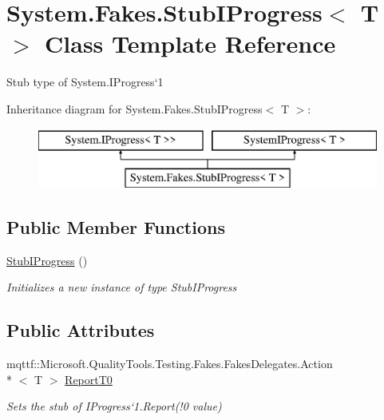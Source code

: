 \hypertarget{class_system_1_1_fakes_1_1_stub_i_progress_3_01_t_01_4}{\section{System.\-Fakes.\-Stub\-I\-Progress$<$ T $>$ Class Template Reference}
\label{class_system_1_1_fakes_1_1_stub_i_progress_3_01_t_01_4}
}


Stub type of System.\-I\-Progress`1 


Inheritance diagram for System.\-Fakes.\-Stub\-I\-Progress$<$ T $>$\-:\begin{figure}[H]
\begin{center}
\leavevmode
\includegraphics[height=2.000000cm]{class_system_1_1_fakes_1_1_stub_i_progress_3_01_t_01_4}
\end{center}
\end{figure}
\subsection*{Public Member Functions}
\begin{DoxyCompactItemize}
\item 
\hyperlink{class_system_1_1_fakes_1_1_stub_i_progress_3_01_t_01_4_ab850596642686dc6fd48a9c1e2dcc16e}{Stub\-I\-Progress} ()
\begin{DoxyCompactList}\small\item\em Initializes a new instance of type Stub\-I\-Progress\end{DoxyCompactList}\end{DoxyCompactItemize}
\subsection*{Public Attributes}
\begin{DoxyCompactItemize}
\item 
mqttf\-::\-Microsoft.\-Quality\-Tools.\-Testing.\-Fakes.\-Fakes\-Delegates.\-Action\\*
$<$ T $>$ \hyperlink{class_system_1_1_fakes_1_1_stub_i_progress_3_01_t_01_4_a3023df3559c8ad850b3af5d5ad338f0d}{Report\-T0}
\begin{DoxyCompactList}\small\item\em Sets the stub of I\-Progress`1.Report(!0 value)\end{DoxyCompactList}\end{DoxyCompactItemize}


